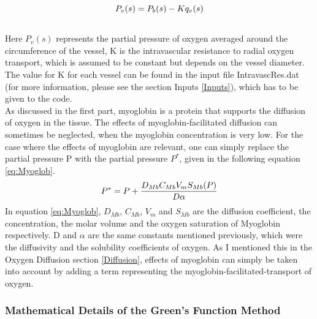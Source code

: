 \begin{equation}
\\P_v(s) = P_b(s) - Kq_v(s)
\label{eq:Hellums}
\end{equation}
\\Here $P_v(s)$ represents the partial pressure of oxygen averaged around the circumference of the vessel, K is the intravascular resistance to radial oxygen transport, which is assumed to be constant but depends on the vessel diameter. The value for K for each vessel can be found in the input file IntravascRes.dat (for more information, please see the section Inputs \ref{Inputs}), which has to be given to the code.
%
\\As discussed in the first part, myoglobin is a protein that supports the diffusion of oxygen in the tissue. The effects of myoglobin-facilitated diffusion can sometimes be neglected, when the myoglobin concentration is very low. For the case where the effects of myoglobin are relevant, one can simply replace the partial pressure P with the partial pressure $P^*$, given in the following equation \ref{eq:Myoglob}.
\begin{equation}
\\P^* = P + \frac{D_{Mb}C_{Mb}V_mS_{Mb}(P)}{D \alpha}
\label{eq:Myoglob}
\end{equation}
In equation \ref{eq:Myoglob}, $D_{Mb}$, $C_{Mb}$, $V_m$ and $S_{Mb}$ are the diffusion coefficient, the concentration, the molar volume and the oxygen saturation of Myoglobin respectively. D and $\alpha$ are the same constants mentioned previously, which were the diffusivity and the solubility coefficients of oxygen. As I mentioned this in the Oxygen Diffusion section \ref{Diffusion}, effects of myoglobin can simply be taken into account by adding a term representing the myoglobin-facilitated-transport of oxygen.

\newpage
\subsubsection{Mathematical Details of the Green's Function Method}


